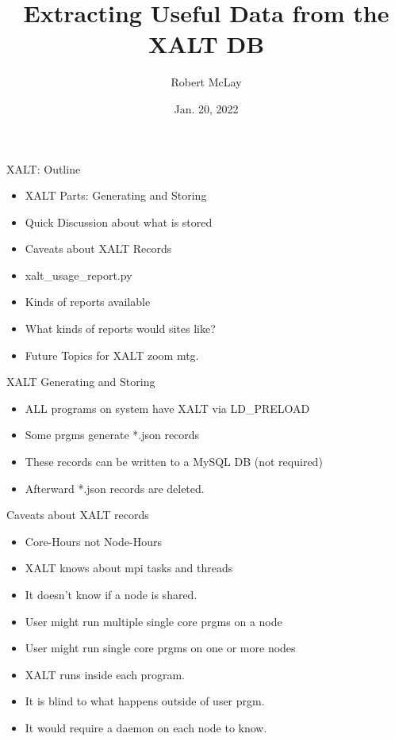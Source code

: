 \documentclass{beamer}
\begin{document}
\title[XALT]{Extracting Useful Data from the XALT DB}
\author{Robert McLay} 
\date{Jan. 20, 2022} 

\frame{\titlepage} 

\begin{frame}{XALT: Outline}
  \begin{itemize}
    \item XALT Parts: Generating and Storing
    \item Quick Discussion about what is stored
    \item Caveats about XALT Records
    \item xalt\_usage\_report.py
    \item Kinds of reports available
    \item What kinds of reports would sites like?
    \item Future Topics for XALT zoom mtg.
  \end{itemize}
\end{frame}

\begin{frame}{XALT Generating and Storing}
  \begin{itemize}
    \item ALL programs on system have XALT via LD\_PRELOAD
    \item Some prgms generate \**.json records
    \item These records can be written to a MySQL DB (not required) 
    \item Afterward \**.json records are deleted.
  \end{itemize}
\end{frame}

\begin{frame}{Caveats about XALT records}
  \begin{itemize}
    \item Core-Hours not Node-Hours 
    \item XALT knows about mpi tasks and threads
    \item It doesn't know if a node is shared.
    \item User might run multiple single core prgms on a node
    \item User might run single core prgms on one or more nodes
    \item XALT runs inside each program.
    \item It is blind to what happens outside of user prgm.
    \item It would require a daemon on each node to know.
  \end{itemize}
\end{frame}
\end{document}
